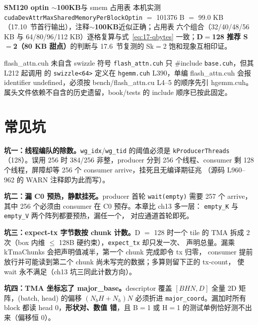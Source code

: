 \begin{kaogu}[F1 核校通过]{\textbf{SM120 optin $\sim$100KB}与 smem 占用表}
  本机实测 \texttt{cuda\allowbreak{}Dev\allowbreak{}Attr\allowbreak{}Max\allowbreak{}Shared\allowbreak{}Memory\allowbreak{}Per\allowbreak{}Block\allowbreak{}Optin} $=$ 101376 B
  $=$ 99.0 KB（17.10~节首行输出），注释\textbf{$\sim$100KB}近似正确；占用表
  六个组合（32/40/48/56 KB 与 64/80/96/112 KB）逐格复算与式~\ref{eq:17-qbytes}
  一致；\textbf{D$=$128 推荐 S$=$2（80 KB 甜点）}的判断与 17.6~节复测的
  Sk$=$2 饱和现象互相印证。
\end{kaogu}

\begin{kaogu}[F5·依赖关系考据]{flash\_attn.cuh 未自含 swizzle 符号}
  \texttt{flash\_\allowbreak{}attn.\allowbreak{}cuh} 只 \#include \texttt{base.cuh}，但其 L212 起调用
  的 \texttt{swizzle<64>} 定义在 \texttt{hgemm.cuh} L390，单编 flash\_attn.cuh
  会报 identifier undefined，必须按 bench/flash\_attn.cu L4--5 的顺序先引 hgemm.cuh。
  属头文件依赖不自含的历史遗留，book/tests 的 include 顺序已按此固定。
\end{kaogu}

\section{常见坑}

\textbf{坑一：线程编队的除数。}\texttt{wg\_idx}/\texttt{wg\_tid} 的阈值必须是
\texttt{k\allowbreak{}Producer\allowbreak{}Threads}（128）。误用 256 时 384/256 非整，producer 分到 256
个线程、consumer 剩 128 个线程，屏障却等 256 个 consumer arrive，挂死且无编译期征兆
（源码 L960--962 的 WARN 注释即为此而写）。

\textbf{坑二：漏 C0 预热，静默挂死。}\allowbreak{}producer 首轮 \texttt{wait(empty)} 需要
257 个 arrive，其中 256 个必须由 consumer 在 C0 预存。本章比 ch13 多一层：
\texttt{empty\_K} 与 \texttt{empty\_V} 两个阵列都要预热，漏任一个，
对应通道首轮即死。

\textbf{坑三：expect-tx 字节数按 chunk 计数。}\allowbreak{}D $=$ 128 时一个 tile 的 TMA
拆成 2 次（box 内维 $\le$ 128B 硬约束），\texttt{expect\_tx} 却只发一次、
声明总量。漏乘 kTmaChunks 会把声明值减半，第一个 chunk 完成即令 tx 归零，
consumer 提前放行并可能读到第二个 chunk 尚未写完的数据；多算则留下正的 tx-count，
使 wait 永不满足（ch13 坑三同此计数方向）。

\textbf{坑四：TMA 坐标忘了 major\_base。}\allowbreak{}descriptor 覆盖 $[BHN, D]$ 全量
2D 矩阵，(batch, head) 的偏移 $(N_b H + N_h) N$ 必须折进
\texttt{major\_coord}。漏加时所有 block 都读 head 0，\textbf{形状对、数值
错}，且 B$=$1 或 H$=$1 的测试单例恰好测不出来（偏移恒 0）。

